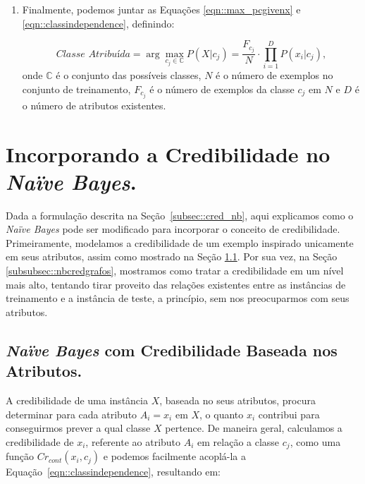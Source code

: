 \begin{enumerate}
\begin{itemize}
    \end{itemize}

    \item Finalmente, podemos juntar as Equações \ref{eqn::max_pcgivenx} e \ref{eqn::classindependence}, definindo:

    \begin{equation}\label{eqn::nbfinal}
    \textit{Classe Atribuída} = \arg\max_{c_j \in \mathbb{C}}P(X|c_j) = \frac{F_{c_j}}{N} \cdot {\prod^{D}_{i=1}{P(x_i|c_j) }},
    \end{equation}
    onde $\mathbb{C}$ é o conjunto das possíveis classes, $N$ é o número de exemplos no conjunto de treinamento, $F_{c_j}$ é o número de exemplos da classe $c_j$ em $N$ e $D$ é o número de atributos existentes.


\end{enumerate}


\section{Incorporando a Credibilidade no \textit{Naïve Bayes}.}
\label{subsubsec::nb_cred}

Dada a formulação descrita na Seção~\ref{subsec::cred_nb}, aqui explicamos como o \textit{Naïve Bayes} pode ser modificado para incorporar o conceito de credibilidade. Primeiramente, modelamos a credibilidade de um exemplo inspirado unicamente em seus atributos, assim como mostrado na Seção \ref{subsubsec::nbcredatributos}. Por sua vez, na Seção \ref{subsubsec::nbcredgrafos}, mostramos como tratar a credibilidade em um nível mais alto, tentando tirar proveito das relações existentes entre as instâncias de treinamento e a instância de teste, a princípio, sem nos preocuparmos com seus atributos.

\subsection{\textit{Naïve Bayes} com Credibilidade Baseada nos Atributos.}
\label{subsubsec::nbcredatributos}

A credibilidade de uma instância $X$, baseada no seus atributos, procura determinar para cada atributo $A_i = x_i$ em $X$, o quanto $x_i$ contribui para conseguirmos prever a qual classe $X$ pertence. De maneira geral, calculamos a credibilidade de $x_i$, referente ao atributo $A_i$ em relação a classe $c_j$, como uma função $Cr_{cont}(x_i, c_j)$ e podemos facilmente acoplá-la a Equação~\ref{eqn::classindependence}, resultando em:

